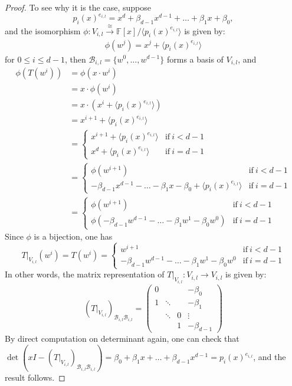 \documentclass[11pt,openany]{book}
\theoremstyle{plain}
\theoremstyle{definition}
\theoremstyle{remark}
\begin{document}
\begin{proof}
\bigskip
To see why it is the case, suppose 
$$p_i(x)^{e_{i,l}} = x^d + \beta_{d-1}x^{d-1} + \dots + \beta_1 x + \beta_0,$$ 
and the isomorphism $\phi : V_{i,l} \xrightarrow{\cong} \mathbb{F}[x]/\langle p_i(x)^{e_{i,l}} \rangle$ is given by:
\begin{align*}
\phi(w^{j}) = x^j + \langle p_i(x)^{e_{i,l}} \rangle 
\end{align*}
for $0 \leq i \leq d-1$, then $\mathcal{B}_{i,l} = \{w^0, \dots, w^{d-1}\}$ forms a basis of $V_{i,l}$, and 
\begin{align*}
\phi(T(w^i)) &= \phi(x \cdot w^i)\\ 
&= x \cdot \phi(w^i)\\ &= x \cdot \left(x^{i} + \langle p_i(x)^{e_{i,l}} \rangle\right)\\ 
&= x^{i+1} + \langle p_i(x)^{e_{i,l}} \rangle \\
&= \begin{cases} x^{i+1} + \langle p_i(x)^{e_{i,l}} \rangle & \text{if}\ i < d-1 \\
x^d +  \langle p_i(x)^{e_{i,l}} \rangle & \text{if}\ i = d-1 \end{cases}\\
&= \begin{cases} \phi(w^{i+1}) & \text{if}\ i < d-1 \\
-\beta_{d-1}x^{d-1} - \dots - \beta_1 x - \beta_0 +  \langle p_i(x)^{e_{i,l}} \rangle & \text{if}\ i = d-1 \end{cases} \\
&= \begin{cases} \phi(w^{i+1}) & \text{if}\ i < d-1 \\
\phi(-\beta_{d-1}w^{d-1} - \dots - \beta_1 w^{1} - \beta_0 w^0) & \text{if}\ i = d-1 \end{cases} 
\end{align*}
Since $\phi$ is a bijection, one has
$$T|_{V_{i,l}}(w^i) = T(w^i)= \begin{cases} w^{i+1} & \text{if}\ i < d-1 \\
-\beta_{d-1}w^{d-1} - \dots - \beta_1 w^{1} - \beta_0 w^0 & \text{if}\ i = d-1 \end{cases} $$
In other words, the matrix representation of $T|_{V_{i,l}}: V_{i,l} \to V_{i,l}$ is given by:
$$(T|_{V_{i,l}})_{\mathcal{B}_{i,l}\mathcal{B}_{i,l}} = \begin{pmatrix}
    0 &  &  &  -\beta_0 \\
    1 & \ddots     & &   -\beta_1 \\
    & \ddots & 0 &  \vdots \\ 
     &  & 1 & -\beta_{d-1}
\end{pmatrix}$$
By direct computation on determinant again, one can check that $\det(xI - (T|_{V_{i,l}})_{\mathcal{B}_{i,l}\mathcal{B}_{i,l}}) = \beta_0 + \beta_1 x + \dots + \beta_{d-1}x^{d-1} = p_i(x)^{e_{i,l}}$, and the result follows.
\end{proof}
\end{document}
